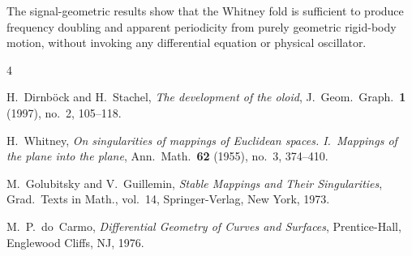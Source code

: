 \documentclass[12pt]{article}
\begin{document}
The signal-geometric results show that the Whitney fold is sufficient to
produce frequency doubling and apparent periodicity from purely geometric
rigid-body motion, without invoking any differential equation or
physical oscillator.

\begin{thebibliography}{4}

H.~Dirnb\"{o}ck and H.~Stachel,
\emph{The development of the oloid},
J.~Geom.\ Graph.\ \textbf{1} (1997), no.~2, 105--118.

H.~Whitney,
\emph{On singularities of mappings of Euclidean spaces.
I.~Mappings of the plane into the plane},
Ann.\ Math.\ \textbf{62} (1955), no.~3, 374--410.

M.~Golubitsky and V.~Guillemin,
\emph{Stable Mappings and Their Singularities},
Grad.\ Texts in Math., vol.~14,
Springer-Verlag, New York, 1973.

M.~P.~do~Carmo,
\emph{Differential Geometry of Curves and Surfaces},
Prentice-Hall, Englewood Cliffs, NJ, 1976.

\end{thebibliography}
\end{document}
